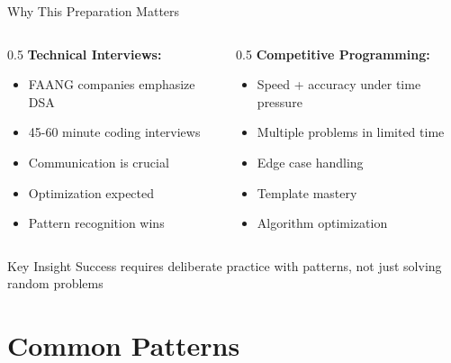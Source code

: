 \documentclass[aspectratio=169,xcolor=dvipsnames]{beamer}
\begin{document}
\begin{frame}{Why This Preparation Matters}
  \begin{columns}
    \begin{column}{0.5\textwidth}
      \textbf{Technical Interviews:}
      \begin{itemize}
        \item FAANG companies emphasize DSA
        \item 45-60 minute coding interviews
        \item Communication is crucial
        \item Optimization expected
        \item Pattern recognition wins
      \end{itemize}
    \end{column}

    \begin{column}{0.5\textwidth}
      \textbf{Competitive Programming:}
      \begin{itemize}
        \item Speed + accuracy under time pressure
        \item Multiple problems in limited time
        \item Edge case handling
        \item Template mastery
        \item Algorithm optimization
      \end{itemize}
    \end{column}
  \end{columns}

  \vspace{0.3cm}
  \begin{alertblock}{Key Insight}
    Success requires deliberate practice with patterns, not just solving random problems
  \end{alertblock}
\end{frame}

\section{Common Patterns}
\end{document}
